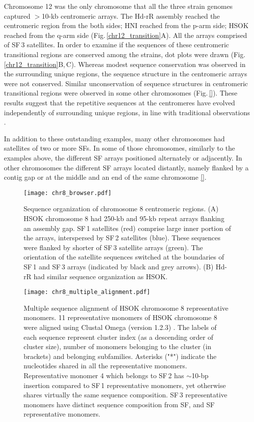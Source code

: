   Chromosome 12 was the only chromosome that all the three strain genomes captured $>$10-kb centromeric arrays. The Hd-rR assembly reached the centromeric region from the both sides; HNI reached from the p-arm side; HSOK reached from the q-arm side (Fig.\,\ref{chr12_transition}A). All the arrays comprised of SF\,3 satellites. In order to examine if the sequences of these centromeric transitional regions are conserved among the strains, dot plots were drawn (Fig.\,\ref{chr12_transition}B,\,C). Whereas modest sequence conservation was observed in the surrounding unique regions, the sequence structure in the centromeric arrays were not conserved. Similar unconservation of sequence structures in centromeric transitional regions were observed in some other chromosomes (Fig.\,\ref{}). These results suggest that the repetitive sequences at the centromeres have evolved independently of surrounding unique regions, in line with traditional observations \cite{Willard1991}.

  In addition to these outstanding examples, many other chromosomes had satellites of two or more SFs. In some of those chromosomes, similarly to the examples above, the different SF arrays positioned alternately or adjacently. In other chromosomes the different SF arrays located distantly, namely flanked by a contig gap or at the middle and an end of the same chromosome \ref{}.


  \begin{figure*}
    \centering
    \texttt{[image: chr8\_browser.pdf]}
    \caption{
      Sequence organization of chromosome 8 centromeric regions. (A) HSOK chromosome 8 had 250-kb and 95-kb repeat arrays flanking an assembly gap. SF\,1 satellites (red) comprise large inner portion of the arrays, interspersed by SF\,2 satellites (blue). These sequences were flanked by shorter of SF\,3 satellite arrays (green). The orientation of the satellite sequences switched at the boundaries of SF\,1 and SF\,3 arrays (indicated by black and grey arrows). (B) Hd-rR had similar sequence organization as HSOK.
    }
    \label{chr8_browser}
  \end{figure*}

  \begin{figure*}
    \centering
    \texttt{[image: chr8\_multiple\_alignment.pdf]}
    \caption{
      Multiple sequence alignment of HSOK chromosome 8 representative monomers. 11 representative monomers of HSOK chromosome 8 were aligned using Clustal Omega (version 1.2.3) \cite{Sievers2011}. The labels of each sequence represent cluster index (as a descending order of cluster size), number of monomers belonging to the cluster (in brackets) and belonging subfamilies. Asterisks ("*") indicate the nucleotides shared in all the representative monomers. Representative monomer 4 which belongs to SF\,2 has $\sim$10-bp insertion compared to SF\,1 representative monomers, yet otherwise shares virtually the same sequence composition. SF\,3 representative monomers have distinct sequence composition from SF\1, and SF\2 representative monomers.
    }
    \label{chr8_multiple_alignment}
  \end{figure*}

